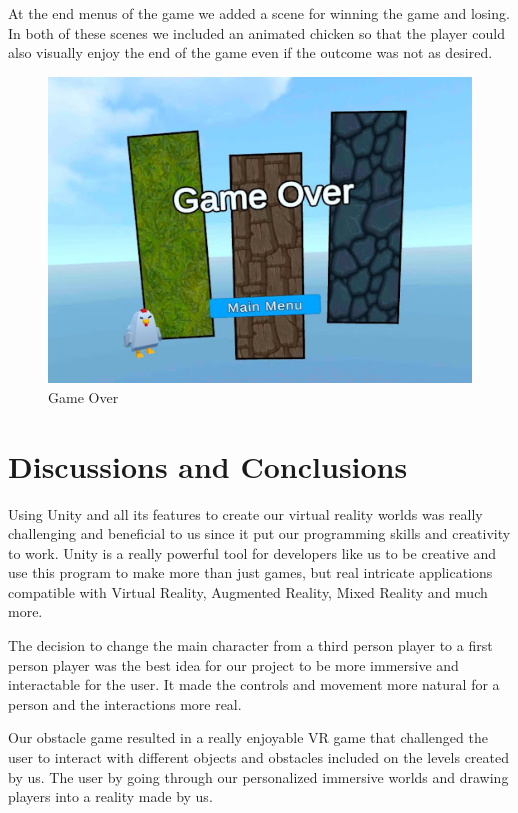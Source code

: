 \documentclass{vgtc}                          %
\begin{document}
At the end menus of the game we added a scene for winning the game and losing. In both of these scenes we included an animated chicken so that the player could also visually enjoy the end of the game even if the outcome was not as desired.

\begin{figure}[tb]
  \centering %
  \includegraphics[width=\columnwidth]{end menu.jpg}
  \caption{Game Over}
 \end{figure}
\section{Discussions and Conclusions}
Using Unity and all its features to create our virtual reality worlds was really challenging and beneficial to us since it  put our programming skills and creativity to work. Unity is a really powerful tool for developers like us to be creative and use this program to make more than just games, but real intricate applications compatible with Virtual Reality, Augmented Reality, Mixed Reality and much more.

The decision to change the main character from a third person player to a first person player was the best idea for our project to be more immersive and interactable for the user. It made the controls and movement more natural for a person and the interactions more real.

Our obstacle game resulted in a really enjoyable VR game that challenged the user to interact with different objects and obstacles included on the levels created by us. The user  by going through our personalized immersive worlds and drawing players into a reality made by us.
\end{document}
